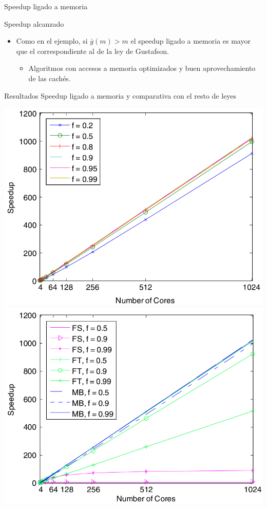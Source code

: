 \documentclass[utf8]{beamer}
\begin{document}
\begin{frame}[allowframebreaks]{Speedup ligado a memoria}
\begin{block}{Speedup alcanzado}
        \begin{itemize}
            \item Como en el ejemplo, si $\bar{g}(m) > m$ el speedup ligado a memoria es mayor que el correspondiente al de la ley de Gustafson.
                \begin{itemize}
                    \item Algoritmos con accesos a memoria optimizados y buen aprovechamiento de las cachés.
                \end{itemize}
        \end{itemize}
    \end{block}
    \begin{block}{Resultados}
        Speedup ligado a memoria y comparativa con el resto de leyes
    \end{block}
    \begin{center}
        \includegraphics[width=.5\linewidth]{figures/mb_speedup}
        \includegraphics[width=.5\linewidth]{figures/all_speedups}
    \end{center}
\end{frame}
\end{document}
